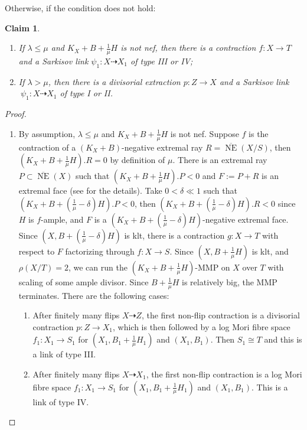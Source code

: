 \documentclass[11pt]{amsart}
\newtheorem{claim}[defn]{Claim}
\begin{document}
Otherwise, if the condition does not hold:
\begin{claim}
  \begin{enumerate}
  \item If $ \lambda\leqslant\mu $ and $ K_X+B+\frac{1}{\mu}H $ is not nef, then there is a contraction $f:X \to T$ and a Sarkisov link $\psi_{1}:X\dashrightarrow X_{1}$ of type III or IV;
    \item  If $ \lambda>\mu $, then there is a divisorial extraction $p:Z\to X$ and a Sarkisov link $\
     \psi_{1}:X\dashrightarrow X_{1}$ of type I or II.
\end{enumerate} 
\end{claim}
\begin{proof}
\begin{enumerate}
  \item\label{a} By assumption,  $\lambda\leqslant \mu$ and   $ K_X+B+\frac{1}{\mu}H $ is not nef. Suppose $ f $ is the contraction of a $ (K_X+B) $-negative extremal ray $ R= \overline{\operatorname{ NE }}(X/S) $, then $ (K_X+B+\frac{1}{\mu}H).R=0 $ by definition of $ \mu $. There is an extremal ray $ P \subset \overline{\operatorname{ NE }}(X) $ such that $ (K_X+B+\frac{1}{\mu}H).P<0 $ and $ F:=P+R $ is an extremal face  (see \cite[5.4.2]{cortiFactoringBirationalMaps} for the details). Take  $ 0<\delta\ll 1 $ such that $ (K_X+B+(\frac{1}{\mu}-\delta)H).P<0 $, then $  (K_X+B+(\frac{1}{\mu}-\delta)H).R<0 $ since $H$ is $f$-ample, and $ F $ is a $  (K_X+B+(\frac{1}{\mu}-\delta)H) $-negative extremal face. Since $ (X,B+(\frac{1}{\mu}-\delta)H) $ is klt, there is  a contraction $ g:X\to T $ with respect  to $ F $ factorizing through $ f:X\to S $. Since  $ (X,B+\frac{1}{\mu}H) $ is klt, and $ \rho(X/T)=2 $,  we can  run the  $ (K_X+B+\frac{1}{\mu}H) $-MMP on $ X  $ over $T$ with scaling of some ample divisor.  Since $ B+\frac{1}{\mu}H $ is relatively big,  the MMP terminates. There are the following cases: 
  \begin{enumerate}
    \item\label{a1} 
      After finitely many flips $ X\dashrightarrow Z $, the first non-flip contraction is a divisorial contraction $ p:Z\to X_1 $, which is then followed by a log Mori fibre space $f_{1}:X_{1}\to S_{1}$ for $(X_{1},B_{1}+\frac{1}{\mu}H_{1})$ and $(X_{1},B_{1})$.
    Then  $S_{1} \cong T$ and this is a link of type III.     
   \item\label{a2}
      After finitely many flips $ X\dashrightarrow X_1 $, the first non-flip contraction is a log Mori fibre space $ f_1:X_1\to S_{1} $ for $(X_{1},B_{1}+\frac{1}{\mu}H_{1})$ and $(X_{1},B_{1})$. This is a link of type IV.  

\end{enumerate}
\end{enumerate}
\end{proof}
\end{document}
